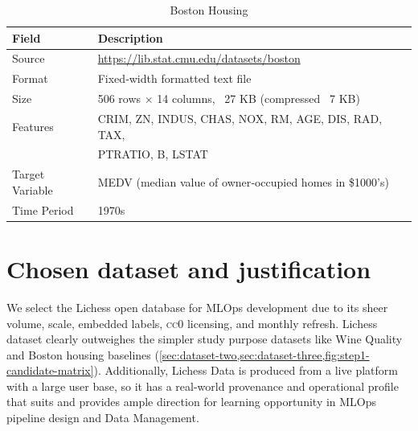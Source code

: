 \begin{table}[h]
\centering
\caption{Boston Housing}
\begin{tabular}{|p{}|p{}|}
\hline
\textbf{Field} & \textbf{Description} \\
\hline
Source & \url{https://lib.stat.cmu.edu/datasets/boston} \\
\hline
Format & Fixed‑width formatted text file \\
\hline
Size & 506 rows × 14 columns, ~27 KB (compressed ~7 KB) \\
\hline
Features & CRIM, ZN, INDUS, CHAS, NOX, RM, AGE, DIS, RAD, TAX, \\
          & PTRATIO, B, LSTAT \\
\hline
Target Variable & MEDV (median value of owner‑occupied homes in \$1000’s) \\
\hline
Time Period & 1970s \\
\hline
\end{tabular}
\end{table}

\section{Chosen dataset and justification}
\label{sec:chosen-dataset}

We select the Lichess open database for MLOps development due to its sheer volume, scale, embedded labels, \textsc{cc}0 licensing, and monthly refresh.  Lichess dataset clearly outweighes the simpler study purpose datasets like Wine Quality and Boston housing baselines (\cref{sec:dataset-two,sec:dataset-three,fig:step1-candidate-matrix}). Additionally, Lichess Data is produced from a live platform with a large user base, so it has a real-world provenance and operational profile that suits and provides ample direction for learning opportunity in MLOps pipeline design and Data Management. 



